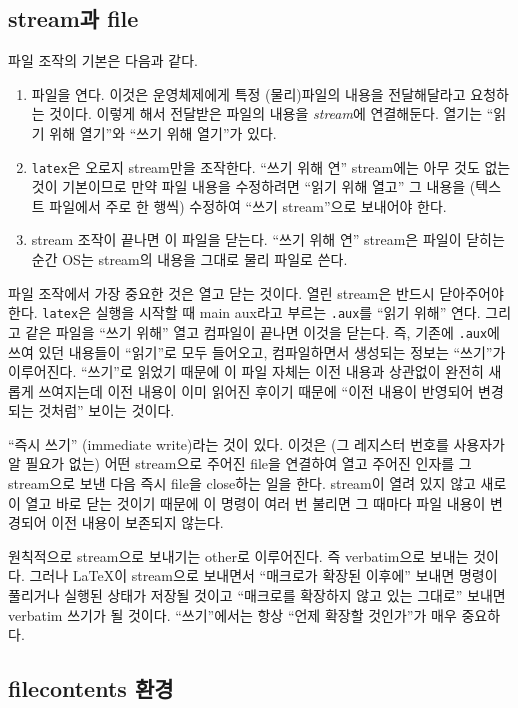 \subsection{stream과 file}

파일 조작의 기본은 다음과 같다.
\begin{enumerate}[(1)]\firmlist
\item 파일을 연다. 이것은 운영체제에게 특정 (물리)파일의 내용을 전달해달라고
요청하는 것이다. 이렇게 해서 전달받은 파일의 내용을 \textit{stream}에 연결해둔다.
열기는 “읽기 위해 열기”와 “쓰기 위해 열기”가 있다.
\item \verb|latex|은 오로지 stream만을 조작한다. “쓰기 위해 연” stream에는
아무 것도 없는 것이 기본이므로 만약 파일 내용을 수정하려면 “읽기 위해 열고”
그 내용을 (텍스트 파일에서 주로 한 행씩) 수정하여 “쓰기 stream”으로 보내어야 한다.
\item stream 조작이 끝나면 이 파일을 닫는다. “쓰기 위해 연” stream은
파일이 닫히는 순간 OS는 stream의 내용을 그대로 물리 파일로 쓴다.
\end{enumerate}

파일 조작에서 가장 중요한 것은 열고 닫는 것이다. 열린 stream은 반드시 닫아주어야 한다.
\verb|latex|은 실행을 시작할 때 main aux라고 부르는 \verb|.aux|를 
“읽기 위해” 연다. 그리고 같은 파일을 “쓰기 위해” 열고
컴파일이 끝나면 이것을 닫는다.  즉, 기존에 \verb|.aux|에 
쓰여 있던 내용들이 “읽기”로 모두 들어오고, 컴파일하면서 생성되는 정보는 “쓰기”가 이루어진다.
“쓰기”로 읽었기 때문에 이 파일 자체는 이전 내용과 상관없이 완전히 새롭게 쓰여지는데 
이전 내용이 이미 읽어진 후이기 때문에 “이전 내용이 반영되어 변경되는 것처럼” 보이는 것이다.

“즉시 쓰기” (immediate write)라는 것이 있다. 이것은 (그 레지스터 번호를 사용자가 알 필요가
없는) 어떤 stream으로 주어진 file을 연결하여 열고 주어진 인자를 그 stream으로 보낸 다음
즉시 file을 close하는 일을 한다. stream이 열려 있지 않고 새로이 열고 바로 닫는 것이기
때문에 이 명령이 여러 번 불리면 그 때마다 파일 내용이 변경되어 이전 내용이 보존되지 않는다.

원칙적으로 stream으로 보내기는 other로 이루어진다. 즉 verbatim으로 보내는 것이다.
그러나 \LaTeX 이 stream으로 보내면서 “매크로가 확장된 이후에” 보내면 명령이 풀리거나 실행된
상태가 저장될 것이고 “매크로를 확장하지 않고 있는 그대로” 보내면 verbatim 쓰기가 될 것이다.
“쓰기”에서는 항상 “언제 확장할 것인가”가 매우 중요하다.

\subsection{filecontents 환경}

